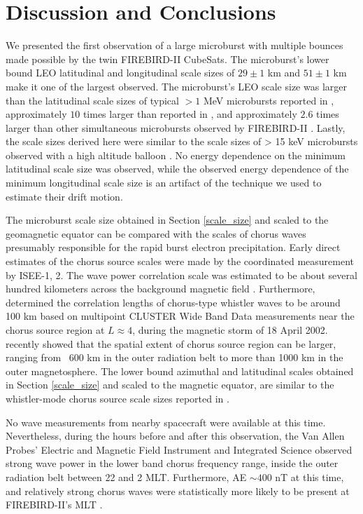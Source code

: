 \section{Discussion and Conclusions} \label{discussion}
We presented the first observation of a large microburst with multiple bounces made possible by the twin FIREBIRD-II CubeSats. The microburst's lower bound LEO latitudinal and longitudinal scale sizes of $29 \pm 1$ km and $ 51 \pm 1$ km make it one of the largest observed. The microburst's LEO scale size was larger than the latitudinal scale sizes of typical $> 1$ MeV microbursts reported in \citet{Blake1996}, approximately $10$ times larger than reported in \citet{Dietrich2010}, and approximately $2.6$ times larger than other simultaneous microbursts observed by FIREBIRD-II \citep{Crew2016}. Lastly, the scale sizes derived here were similar to the scale sizes of > 15 keV microbursts observed with a high altitude balloon \citep{Parks1967}. No energy dependence on the minimum latitudinal scale size was observed, while the observed energy dependence of the minimum longitudinal scale size is an artifact of the technique we used to estimate their drift motion.

The microburst scale size obtained in Section \ref{scale_size} and scaled to the geomagnetic equator can be compared with the scales of chorus waves presumably responsible for the rapid burst electron precipitation. Early direct estimates of the chorus source scales were made by the coordinated measurement by ISEE-1, 2. The wave power correlation scale was estimated to be about several hundred kilometers across the background magnetic field \citep{Gurnett1979}. Furthermore, \citet{Santolik2003} determined the correlation lengths of chorus-type whistler waves to be around 100 km based on multipoint CLUSTER Wide Band Data measurements near the chorus source region at $L \approx 4$, during the magnetic storm of 18 April 2002. \citet{Agapitov2010, Agapitov2011b, Agapitov2017a} recently showed that the spatial extent of chorus source region can be larger, ranging from ~600 km in the outer radiation belt to more than 1000 km in the outer magnetosphere. The lower bound azimuthal and latitudinal scales obtained in Section \ref{scale_size} and scaled to the magnetic equator, are similar to the whistler-mode chorus source scale sizes reported in \citet{Agapitov2011b, Agapitov2017a}. 

No wave measurements from nearby spacecraft were available at this time. Nevertheless, during the hours before and after this observation, the Van Allen Probes' \citep{Mauk2013} Electric and Magnetic Field Instrument and Integrated Science \citep{Kletzing2013} observed strong wave power in the lower band chorus frequency range, inside the outer radiation belt between 22 and 2 MLT. Furthermore, AE $\sim 400$ nT at this time, and relatively strong chorus waves were statistically more likely to be present at FIREBIRD-II's MLT \citep{Li2009}.


